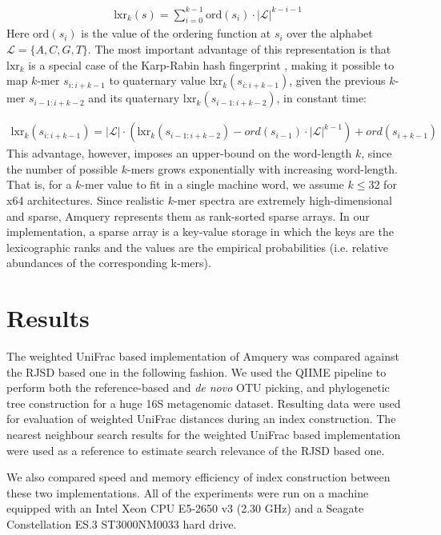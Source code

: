 \documentclass[10pt,letterpaper]{article}
\begin{document}
\begin{eqnarray}
\label{eq:schemeP}
    \mathrm{lxr}_k(s) = \sum_{i=0}^{k−1} \mathrm{ord}(s_i) \cdot |{\mathcal{L}}|^{k−i−1}
\end{eqnarray}
Here $\mathrm{ord}(s_i)$ is the value of the ordering function at $s_i$ over the alphabet ${\mathcal{L}} = \{A, C, G, T \}$. The most important advantage of this representation is that $\mathrm{lxr}_k$ is a special case of the Karp-Rabin hash fingerprint \cite{karp1987efficient}, making it possible to map $k$-mer $s_{i:i+k-1}$ to quaternary value $\mathrm{lxr}_k(s_{i:i+k-1})$, given the previous $k$-mer $s_{i−1:i+k-2}$ and its quaternary $\mathrm{lxr}_k(s_{i−1:i+k-2})$, in constant time:

\begin{eqnarray}
\label{eq:schemeP}
    \mathrm{lxr}_k(s_{i:i+k-1}) = |{\mathcal{L}}| \cdot (\mathrm{lxr}_k(s_{i−1:i+k-2}) − ord(s_{i−1}) \cdot 
									 |{\mathcal{L}}|^{k−1}) + ord(s_{i+k−1})
\end{eqnarray}
This advantage, however, imposes an upper-bound on the word-length $k$, since the number of possible $k$-mers grows exponentially with increasing word-length. That is, for a $k$-mer value to fit in a single machine word, we assume $k \leq 32$ for x64 architectures.
Since realistic ${k}$-mer spectra are extremely high-dimensional and sparse, Amquery represents them as rank-sorted sparse arrays. In our implementation, a sparse array is a key-value storage in which the keys are the lexicographic ranks and the values are the empirical probabilities (i.e. relative abundances of the corresponding k-mers).

\section*{Results}

The weighted UniFrac based implementation of Amquery was compared against the RJSD based one in the following fashion.
We used the QIIME \cite{caporaso2010qiime} pipeline to perform both the reference-based and \textit{de novo} OTU picking, and phylogenetic tree construction for a huge 16S metagenomic dataset.
Resulting data were used for evaluation of weighted UniFrac distances during an index construction. 
The nearest neighbour search results for the weighted UniFrac based implementation were used as a reference to estimate search relevance of the RJSD based one.

We also compared speed and memory efficiency of index construction between these two implementations.
All of the experiments were run on a machine equipped with an Intel Xeon CPU E5-2650 v3 (2.30 GHz) and a Seagate Constellation ES.3 ST3000NM0033 hard drive.
\end{document}
